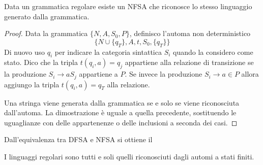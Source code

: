 \documentclass[12pt]{article}
\numberwithin{theorem}{subsection}
\begin{document}
\begin{lemma}
	Data un grammatica regolare esiste un NFSA che riconosce lo stesso linguaggio generato dalla grammatica.
\end{lemma}
\begin{proof}
	Data la grammatica $\{ N, A, S_0, P \}$, definisco l'automa non deterministico
	\[
	\{ N \cup \{ q_T \}, A, t, S_0, \{ q_T \} \}
	\]
	Di nuovo uso $q_i$ per indicare la categoria sintattica $S_i$ quando la considero come stato. Dico che la tripla $t(q_i, a) = q_j$ appartiene alla relazione di transizione se la produzione $S_i \rightarrow a S_j$ appartiene a $P$. Se invece la produzione $S_i \rightarrow a \in P$ allora aggiungo la tripla $t(q_i, a) = q_T$ alla relazione.
	
	Una stringa viene generata dalla grammatica se e solo se viene riconosciuta dall'automa. La dimostrazione è uguale a quella precedente, sostituendo le uguaglianze con delle appartenenze o delle inclusioni a seconda dei casi.
\end{proof}

Dall'equivalenza tra DFSA e NFSA si ottiene il
\begin{corollary}
	I linguaggi regolari sono tutti e soli quelli riconosciuti dagli automi a stati finiti.
\end{corollary}
\end{document}
